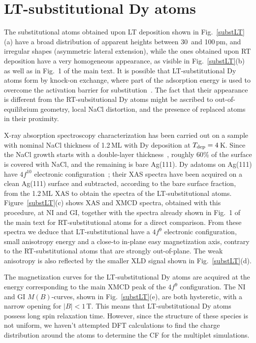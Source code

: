 {\section{LT-substitutional D\lowercase{y}  atoms }
\label{LTsubtit}

 The substitutional atoms obtained upon LT deposition shown in Fig.~\ref{substLT}(a) have a broad distribution of apparent heights between 30\, and 100\,pm, and irregular shapes (asymmetric lateral extension), while the ones obtained upon RT deposition have a very homogeneous appearance, as visible in Fig.~\ref{substLT}(b) as well as in Fig.~1 of the main text. It is possible that LT-substitutional Dy atoms form by knock-on exchange, where part of the adsorption energy is used to overcome the activation barrier for substitution~\cite{kel96, rae96}. The fact that their appearance is different from the RT-subsitutional Dy atoms might be ascribed to out-of-equilibrium geometry, local NaCl distortion, and the presence of replaced atoms in their proximity.

 X-ray absorption spectroscopy characterization has been carried out on a sample with nominal NaCl thickness of 1.2\,ML with Dy deposition at $T_{\rm dep}= 4$\,K. Since the NaCl growth starts with a double-layer thickness~\cite{rep04b}, roughly 60\% of the surface is covered with NaCl, and the remaining is bare Ag(111). Dy adatoms on Ag(111) have $4f^{10}$ electronic configuration~\cite{sin17}; their XAS spectra have been acquired on a clean Ag(111) surface and subtracted, according to the bare surface fraction, from the 1.2\,ML XAS to obtain the spectra of the LT-substitutional atoms. Figure~\ref{substLT}(c) shows XAS and XMCD spectra, obtained with this procedure, at NI and GI, together with the spectra already shown in Fig.~1 of the main text for RT-substitutional atoms for a direct comparison. From these spectra we deduce that LT-substitutional have a $4f^9$ electronic configuration, small anisotropy energy and a close-to in-plane easy magnetization axis, contrary to the RT-substitutional atoms that are strongly out-of-plane. The weak anisotropy is also reflected by the smaller XLD signal shown in Fig.~\ref{substLT}(d).


 The magnetization curves for the LT-substitutional Dy atoms are acquired at the energy corresponding to the main XMCD peak of the $4f^9$ configuration. The NI and GI $M(B)$-curves, shown in Fig.~\ref{substLT}(e), are both hysteretic, with a narrow opening for $|B| < 1$\,T. This means that LT-substitutional Dy atoms possess long spin relaxation time. However, since the structure of these species is not uniform, we haven't attempted DFT calculations to find the charge distribution around the atoms to determine the CF for the multiplet simulations.

}
